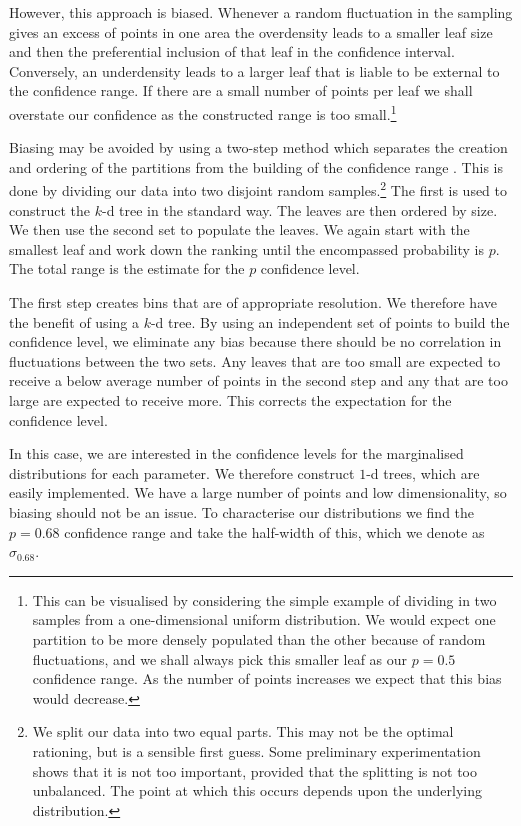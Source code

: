 However, this approach is biased. Whenever a random fluctuation in the sampling gives an excess of points in one area the overdensity leads to a smaller leaf size and then the preferential inclusion of that leaf in the confidence interval. Conversely, an underdensity leads to a larger leaf that is liable to be external to the confidence range. If there are a small number of points per leaf we shall overstate our confidence as the constructed range is too small.\footnote{This can be visualised by considering the simple example of dividing in two samples from a one-dimensional uniform distribution. We would expect one partition to be more densely populated than the other because of random fluctuations, and we shall always pick this smaller leaf as our $p = 0.5$ confidence range. As the number of points increases we expect that this bias would decrease.}

Biasing may be avoided by using a two-step method which separates the creation and ordering of the partitions from the building of the confidence range \citep{Sidery2013}. This is done by dividing our data into two disjoint random samples.\footnote{We split our data into two equal parts. This may not be the optimal rationing, but is a sensible first guess. Some preliminary experimentation shows that it is not too important, provided that the splitting is not too unbalanced. The point at which this occurs depends upon the underlying distribution.} The first is used to construct the $k$-d tree in the standard way. The leaves are then ordered by size. We then use the second set to populate the leaves. We again start with the smallest leaf and work down the ranking until the encompassed probability is $p$. The total range is the estimate for the $p$ confidence level.

The first step creates bins that are of appropriate resolution. We therefore have the benefit of using a $k$-d tree. By using an independent set of points to build the confidence level, we eliminate any bias because there should be no correlation in fluctuations between the two sets. Any leaves that are too small are expected to receive a below average number of points in the second step and any that are too large are expected to receive more. This corrects the expectation for the confidence level.

In this case, we are interested in the confidence levels for the marginalised distributions for each parameter. We therefore construct $1$-d trees, which are easily implemented. We have a large number of points and low dimensionality, so biasing should not be an issue. To characterise our distributions we find the $p = 0.68$ confidence range and take the half-width of this, which we denote as $\sigma_{0.68}$.

